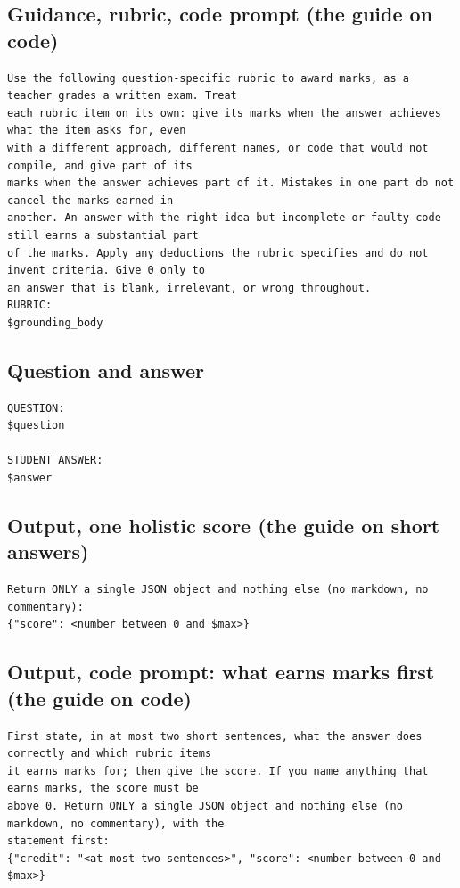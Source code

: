 \documentclass[10pt]{article}
\begin{document}
\subsection*{Guidance, rubric, code prompt (the guide on code)}
\begin{Verbatim}[fontsize=\footnotesize]
Use the following question-specific rubric to award marks, as a teacher grades a written exam. Treat
each rubric item on its own: give its marks when the answer achieves what the item asks for, even
with a different approach, different names, or code that would not compile, and give part of its
marks when the answer achieves part of it. Mistakes in one part do not cancel the marks earned in
another. An answer with the right idea but incomplete or faulty code still earns a substantial part
of the marks. Apply any deductions the rubric specifies and do not invent criteria. Give 0 only to
an answer that is blank, irrelevant, or wrong throughout.
RUBRIC:
$grounding_body
\end{Verbatim}
\subsection*{Question and answer}
\begin{Verbatim}[fontsize=\footnotesize]
QUESTION:
$question

STUDENT ANSWER:
$answer
\end{Verbatim}
\subsection*{Output, one holistic score (the guide on short answers)}
\begin{Verbatim}[fontsize=\footnotesize]
Return ONLY a single JSON object and nothing else (no markdown, no commentary):
{"score": <number between 0 and $max>}
\end{Verbatim}
\subsection*{Output, code prompt: what earns marks first (the guide on code)}
\begin{Verbatim}[fontsize=\footnotesize]
First state, in at most two short sentences, what the answer does correctly and which rubric items
it earns marks for; then give the score. If you name anything that earns marks, the score must be
above 0. Return ONLY a single JSON object and nothing else (no markdown, no commentary), with the
statement first:
{"credit": "<at most two sentences>", "score": <number between 0 and $max>}
\end{Verbatim}
\end{document}
